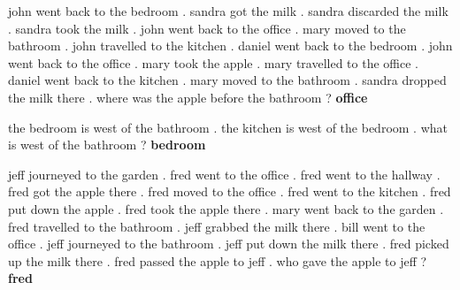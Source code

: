 \begin{table}[htb!]
\begin{tcbraster}[raster columns=2, size=minimal, raster valign=top]
     \begin{tcolorbox}[mybox, title=Task 3: Three supporting fact] 
    \tiny
     john went back to the bedroom . sandra got the milk . sandra discarded the milk . sandra took the milk . john went back to the office . mary moved to the bathroom . john travelled to the kitchen . daniel went back to the bedroom . john went back to the office . mary took the apple . mary travelled to the office . daniel went back to the kitchen . mary moved to the bathroom . sandra dropped the milk there . where was the apple before the bathroom ? \textbf{office} 
    \end{tcolorbox}  
    \begin{tcolorbox}[mybox, title=Task 4: Two argument relations] 
    \tiny
    the bedroom is west of the bathroom . the kitchen is west of the bedroom . what is west of the bathroom ? \textbf{bedroom}
    \end{tcolorbox}    
    \begin{tcolorbox}[mybox, title=Task 5: Three argument relations] 
    \tiny
    jeff journeyed to the garden . fred went to the office . fred went to the hallway . fred got the apple there . fred moved to the office . fred went to the kitchen . fred put down the apple . fred took the apple there . mary went back to the garden . fred travelled to the bathroom . jeff grabbed the milk there . bill went to the office . jeff journeyed to the bathroom . jeff put down the milk there . fred picked up the milk there . fred passed the apple to jeff . who gave the apple to jeff ? \textbf{fred }

\end{tcolorbox}
\end{tcbraster}
\end{table}
